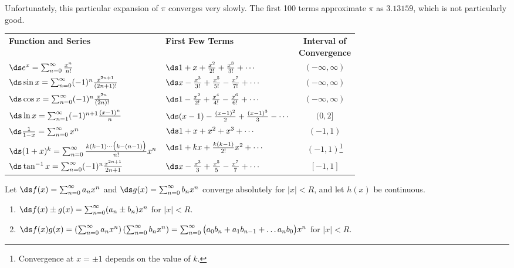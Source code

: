 Unfortunately, this particular expansion of $\pi$ converges very slowly. The first 
100 terms approximate $\pi$ as $3.13159$, which is not particularly good.
\clearpage
\enlargethispage{4\baselineskip}
\setboxwidth{110pt}
\noindent\hskip-110pt\begin{minipage}{1.3\linewidth}
{%
\noindent\begin{tabular}{llc}
\textbf{Function and Series} & \textbf{First Few Terms} & \parbox{50pt}{\centering\textbf{Interval of}\\\textbf{Convergence}} \\
\rule{0pt}{25pt}$\ds e^x = \sum_{n=0}^\infty \frac{x^n}{n!}$ & $\ds 1+ x+\frac{x^2}{2!} + \frac{x^3}{3!}+\cdots$ & $(-\infty,\infty)$\\
\rule{0pt}{25pt}$\ds \sin x = \sum_{n=0}^\infty (-1)^n\frac{x^{2n+1}}{(2n+1)!}$ & $\ds x-\frac{x^3}{3!}+\frac{x^5}{5!} - \frac{x^7}{7!}+\cdots$ & $(-\infty,\infty)$\\
\rule{0pt}{25pt}$\ds \cos x = \sum_{n=0}^\infty (-1)^n\frac{x^{2n}}{(2n)!}$ & $\ds 1-\frac{x^2}{2!}+\frac{x^4}{4!} - \frac{x^6}{6!} +\cdots$ & $(-\infty,\infty)$\\
\rule{0pt}{25pt}$\ds \ln x = \sum_{n=1}^\infty(-1)^{n+1}\frac{(x-1)^n}{n}$ & $\ds (x-1)- \frac{(x-1)^2}{2} +\frac{(x-1)^3}{3}-\cdots$& $(0,2]$\\
\rule{0pt}{25pt}$\ds \frac{1}{1-x} = \sum_{n=0}^\infty x^n$ &$\ds 1+x+x^2+x^3+\cdots$& $(-1,1)$\\
\rule{0pt}{25pt}\small$\ds (1+x)^k=\sum_{n=0}^\infty \frac{k(k-1)\cdots\big(k-(n-1)\big)}{n!}x^n$ \normalsize& $\ds 1+kx+\frac{k(k-1)}{2!}x^2 + \cdots$ & $(-1,1)$\footnote{Convergence at $x=\pm1$ depends on the value of $k$.}\\
\rule{0pt}{25pt}$\ds \tan^{-1}x = \sum_{n=0}^\infty (-1)^n\frac{x^{2n+1}}{2n+1}$ & $\ds x-\frac{x^3}{3}+\frac{x^5}{5}-\frac{x^7}{7}+\cdots$ & $[-1,1]$
\end{tabular}
}

\baselineskip

{Let $\ds f(x) = \sum_{n=0}^\infty a_nx^n$ and $\ds g(x) = \sum_{n=0}^\infty b_nx^n$ converge absolutely for $|x|<R$, and let $h(x)$ be continuous.
\begin{enumerate}
	\item $\ds f(x)\pm g(x) = \sum_{n=0}^\infty (a_n\pm b_n)x^n$ \quad for $|x|<R$.
	\item	$\ds 	f(x)g(x) = \left(\sum_{n=0}^\infty a_nx^n\right)\left(\sum_{n=0}^\infty b_nx^n\right) = \sum_{n=0}^\infty\big(a_0b_n+a_1b_{n-1}+\ldots a_nb_0\big)x^n
		$ for $|x|<R$.
	

\end{enumerate}}
\end{minipage}
